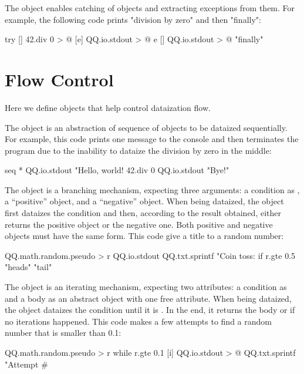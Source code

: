 \documentclass[sigplan,nonacm]{acmart}
\newcommand\aff[1]{\ff{\textcolor{gray}{$\star$}#1}}
\newcommand\adeff[1]{\aff{\textcolor{blue!50!black}{\textbf{#1}}}}
\begin{document}
The \adeff{try} object enables catching of \aff{error} objects and extracting
exceptions from them. For example, the following code prints "division by zero"
and then "finally":

\begin{ffcode}
try
  []
    42.div 0 > @
  [e]
    QQ.io.stdout > @
      e
  []
    QQ.io.stdout > @
      "finally"
\end{ffcode}

\section{Flow Control}\label{sec:flow}

Here we define objects that help control dataization flow.

The \adeff{seq} object is an abstraction of sequence of objects to be dataized
sequentially. For example, this code prints one message to the console and then
terminates the program due to the inability to dataize the division by zero in
the middle:

\begin{ffcode}
seq
  *
    QQ.io.stdout "Hello, world!
    42.div 0
    QQ.io.stdout "Bye!"
\end{ffcode}

The \adeff{if} object is a branching mechanism, expecting three arguments: a
condition as , a ``positive'' object, and a ``negative'' object. When
being dataized, the object \aff{if} first dataizes the condition and then,
according to the result obtained, either returns the positive object or the
negative one. Both positive and negative objects must have the same form. This
code give a title to a random number:

\begin{ffcode}
QQ.math.random.pseudo > r
QQ.io.stdout
  QQ.txt.sprintf
    "Coin toss: %
    if
      r.gte 0.5
      "heads"
      "tail"
\end{ffcode}

The \adeff{while} object is an iterating mechanism, expecting two attributes: a
condition as  and a body as an abstract object with one free
attribute. When being dataized, the object \aff{while} dataizes the condition
until it is . In the end, it returns the body or  if no
iterations happened. This code makes a few attempts to find a random number
that is smaller than 0.1:

\begin{ffcode}
QQ.math.random.pseudo > r
while
  r.gte 0.1
  [i]
    QQ.io.stdout > @
      QQ.txt.sprintf
        "Attempt #%
\end{ffcode}
\end{document}
